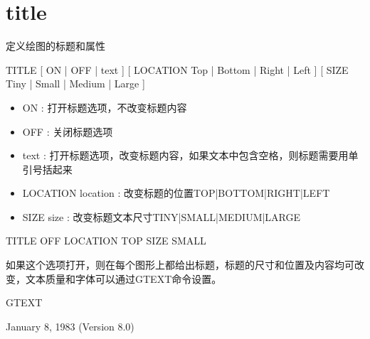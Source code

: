 \section{title}
\label{cmd:title}

定义绘图的标题和属性

TITLE [ ON | OFF | text ] [ LOCATION Top | Bottom | Right | Left ] [ SIZE Tiny | Small | Medium | Large ]

\begin{itemize}
\item ON : 打开标题选项，不改变标题内容
\item OFF : 关闭标题选项 
\item text : 打开标题选项，改变标题内容，如果文本中包含空格，则标题需要用单引号括起来 
\item LOCATION location : 改变标题的位置TOP|BOTTOM|RIGHT|LEFT 
\item SIZE size : 改变标题文本尺寸TINY|SMALL|MEDIUM|LARGE 
\end{itemize}

TITLE OFF LOCATION TOP SIZE SMALL

如果这个选项打开，则在每个图形上都给出标题，标题的尺寸和位置及内容均可改变，文本质量和字体可以通过GTEXT命令设置。

GTEXT

January 8, 1983 (Version 8.0)

